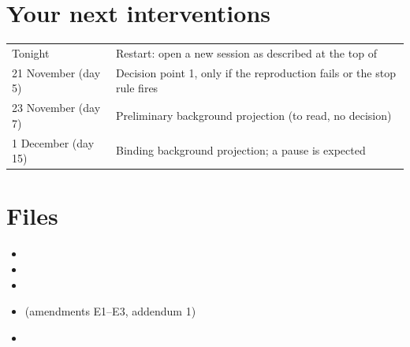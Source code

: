 \documentclass[11pt,a4paper]{article}
\begin{document}
\section{Your next interventions}
\begin{center}
\begin{tabular}{L{4.2cm}L{10.0cm}}
\toprule
Tonight & Restart: open a new session as described at the top of  \\
21 November (day 5) & Decision point 1, only if the reproduction fails or the stop rule fires \\
23 November (day 7) & Preliminary background projection (to read, no decision) \\
1 December (day 15) & Binding background projection; a pause is expected \\
\bottomrule
\end{tabular}
\end{center}

\section*{Files}
\begin{itemize}
\item {}
\item {}
\item {}
\item {} (amendments E1--E3, addendum 1)
\item {}
\end{itemize}
\end{document}
